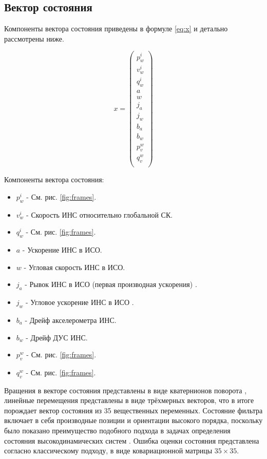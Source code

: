 \documentclass[12pt,a4paper]{article}
\begin{document}
\subsection{Вектор состояния}

Компоненты вектора состояния приведены в формуле \ref{eq:x} и детально рассмотрены ниже.

\begin{equation}
    \label{eq:x}
    x=\left(
    \begin{array}{c}
    p_w^i \\
    v_w^i \\
    q_w^i \\
    a \\
    w \\
    j_a \\
    j_w \\
    b_a \\
    b_w \\
    p_v^w \\
    q_v^w \\
    \end{array}
    \right)
\end{equation}

Компоненты вектора состояния:
\begin{itemize}
    \item $p_w^i$ - См. рис. \ref{fig:frames}.
    \item $v_w^i$ - Скорость ИНС относительно глобальной СК.
    \item $q_w^i$ - См. рис. \ref{fig:frames}.
    \item $a$ - Ускорение ИНС в ИСО.
    \item $w$ - Угловая скорость ИНС в ИСО.
    \item $j_a$ - Рывок ИНС в ИСО (первая производная ускорения) \cite{Kishore94}.
    \item $j_w$ - Угловое ускорение ИНС в ИСО \cite{Kishore94}.
    \item $b_a$ - Дрейф акселерометра ИНС.
    \item $b_w$ - Дрейф ДУС ИНС.
    \item $p_v^w$ - См. рис. \ref{fig:frames}.
    \item $q_v^w$ - См. рис. \ref{fig:frames}.
\end{itemize}

Вращения в векторе состояния представлены в виде кватернионов поворота \cite{QuaternionsMadgwick}, линейные перемещения представлены в виде трёхмерных векторов, что в итоге порождает вектор состояния из 35 вещественных переменных. Состояние фильтра включает в себя производные позиции и ориентации высокого порядка, поскольку было показано преимущество подобного подхода в задачах определения состояния высокодинамических систем \cite{Kishore94}. Ошибка оценки состояния представлена согласно классическому подходу, в виде ковариационной матрицы $35 \times 35$.
\end{document}
